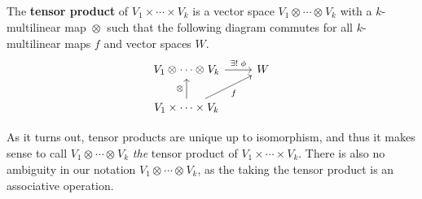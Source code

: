 \documentclass[twoside,10pt]{article}
\begin{document}
\begin{defn}[]
The \textbf{tensor product} of $V_1 \times \cdots \times V_k$ is a vector space $V_1 \otimes_{}\cdots \otimes_{}V_{k}$ with a $k$-multilinear map $\otimes_{}$ such that the following diagram commutes for all $k$-multilinear maps $f$ and vector spaces $W$.
\[
	\begin{tikzcd}
		V_1 \otimes_{}\cdots \otimes_{}V_{k} \rar{\exists!\;\phi} & W \\
		V_1 \times \cdots \times V_{k} \uar{\otimes_{}} \arrow[ur, "f"']
	\end{tikzcd}
\] 
\end{defn}

As it turns out, tensor products are unique up to isomorphism, and thus it makes sense to call $V_1 \otimes_{}\cdots \otimes_{}V_{k}$ \textit{the} tensor product of $V_1 \times \cdots \times V_{k}$. There is also no ambiguity in our notation $V_1 \otimes_{}\cdots \otimes_{}V_{k}$, as the taking the tensor product is an associative operation.
\end{document}

